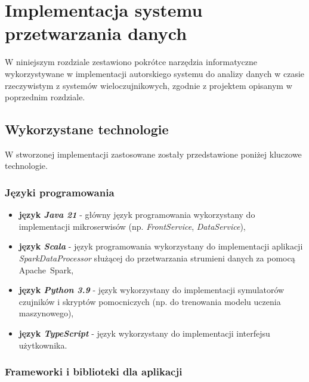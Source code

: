 \section{Implementacja systemu przetwarzania danych}
\label{sec:implementacja_systemu}

W niniejszym rozdziale zestawiono pokrótce narzędzia informatyczne wykorzystywane w implementacji autorskiego systemu do analizy danych w czasie rzeczywistym z systemów wieloczujnikowych,
zgodnie z projektem opisanym w poprzednim rozdziale.

\subsection{Wykorzystane technologie}
\label{subsec:technologie}

W stworzonej implementacji zastosowane zostały przedstawione poniżej kluczowe technologie.

\subsubsection{Języki programowania}
\label{subsubsec:jezyki_programowania}

\begin{itemize}
    \item \textbf{język \textit{Java 21}} - główny język programowania wykorzystany do implementacji mikroserwisów (np. \textit{FrontService}, \textit{DataService}),
    \item \textbf{język \textit{Scala}} - język programowania wykorzystany do implementacji aplikacji \textit{SparkDataProcessor} służącej do przetwarzania strumieni danych za pomocą \mbox{Apache Spark},
    \item \textbf{język \textit{Python 3.9}} - język wykorzystany do implementacji symulatorów czujników i skryptów pomocniczych (np. do trenowania modelu uczenia maszynowego),
    \item \textbf{język \textit{TypeScript}} - język wykorzystany do implementacji interfejsu użytkownika.
\end{itemize}

\subsubsection{Frameworki i biblioteki dla aplikacji}
\label{subsubsec:frameworki}

